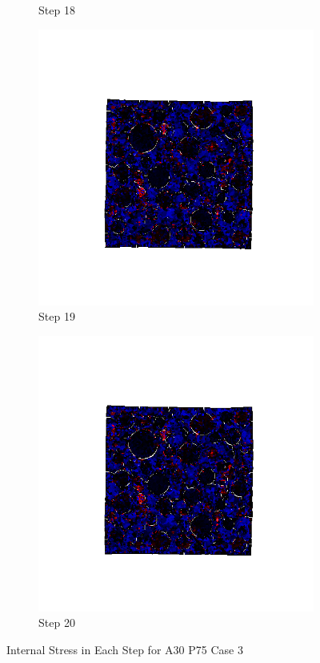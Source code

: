 \begin{figure}[ht!]
\begin{subfigure}{.25\textwidth}
      \caption{Step 18}
      \end{subfigure}%
      \begin{subfigure}{.25\textwidth}
        \centering
        \includegraphics[width=1.0\linewidth]{Files/A30P75_3_IS/DEP50-STEP(019).png}
      \caption{Step 19}
      \end{subfigure}%
      \begin{subfigure}{.25\textwidth}
        \centering
        \includegraphics[width=1.0\linewidth]{Files/A30P75_3_IS/DEP50-STEP(020).png}
      \caption{Step 20}
      \end{subfigure}

  \caption{Internal Stress in Each Step for A30 P75 Case 3}
  \label{fig:ASR_A30P75_3_IS}
  \end{figure}

